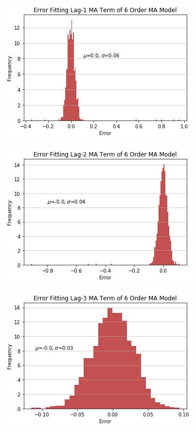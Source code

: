 \documentclass[oneside,12pt,openany]{book}
\begin{document}
	\begin{figure}[!ht]
		\centering
		\includegraphics[width=.85\linewidth]{images/MAModelMALag1CoefDist.png}
	\end{figure}
	
	\begin{figure}[!ht]
		\centering
		\includegraphics[width=.85\linewidth]{images/MAModelMALag2CoefDist.png}
	\end{figure}
	\begin{figure}[!ht]
		\centering
		\includegraphics[width=.85\linewidth]{images/MAModelMALag3CoefDist.png}
	\end{figure}
	
\end{document}
